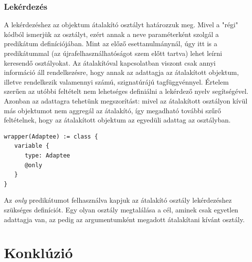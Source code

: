 \documentclass[a4paper,12pt]{report}
\begin{document}
\subsection{Lekérdezés}
A lekérdezéshez az objektum átalakító osztályt határozzuk meg. Mivel a "régi" kódból ismerjük az osztályt, ezért annak a neve paraméterként szolgál a predikátum definíciójában. Mint az előző esettanulmánynál, úgy itt is a predikátummal (az újrafelhasználhatóságot szem előtt tartva) lehet leírni keresendő osztályokat. Az átalakítóval kapcsolatban viszont csak annyi információ áll rendelkezésre, hogy annak az adattagja az átalakított objektum, illetve rendelkezik valamennyi számú, szignatúrájú tagfüggvénnyel. Értelem szerűen az utóbbi feltételt nem lehetséges definiálni a lekérdező nyelv segítségével. Azonban az adattagra tehetünk megszorítást: mivel az átalakított osztályon kívül más objektumot nem aggregál az átalakító, így megadható további szűrő feltételnek, hogy az átalakított objektum az egyedüli adattag az osztályban.
\begin{verbatim}
wrapper(Adaptee) := class {
   variable { 
      type: Adaptee
      @only
   }
}
\end{verbatim}
\par Az \textit{only} predikátumot felhasználva kapjuk az átalakító osztály lekérdezéshez szükséges definíciót. Egy olyan osztály megtalálása a cél, aminek csak egyetlen adattagja van, az pedig az argumentumként megadott átalakítani kívánt osztály.

\chapter{Konklúzió}
\end{document}
